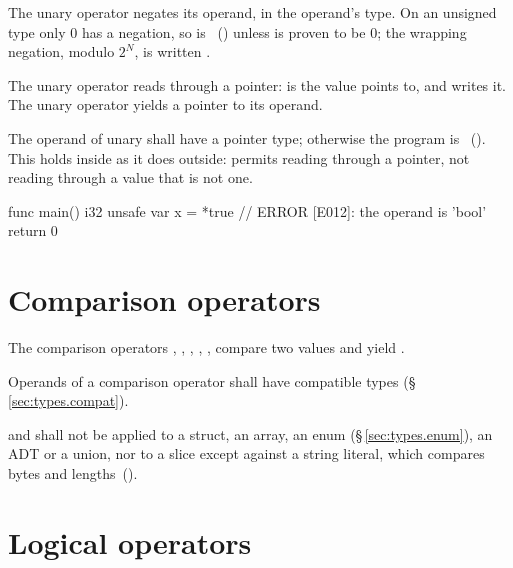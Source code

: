 \pnum
The unary \lain{-} operator negates its operand, in the operand's type.  On an unsigned
type only 0 has a negation, so  is \illformed{}~() unless 
is proven to be 0; the wrapping negation, modulo \(2^N\), is written .

\pnum
The unary \lain{*} operator reads through a pointer:  is the value  points to, and
 writes it.  The unary \lain{\&} operator yields a pointer to its operand.

\begin{constraint}
  The operand of unary \lain{*} shall have a pointer type; otherwise the program is
  \illformed{}~().  This holds inside  as it does outside: 
  permits reading through a pointer, not reading through a value that is not one.
\end{constraint}

\begin{laincode}
func main() i32 {
    unsafe {
        var x = *true      // ERROR [E012]: the operand is 'bool'
    }
    return 0
}
\end{laincode}

\section{Comparison operators}
\label{sec:expr.compare}

\pnum
The comparison operators \lain{==}, \lain{!=}, \lain{<}, \lain{>},
\lain{<=}, \lain{>=} compare two values and yield .

\begin{constraint}
  Operands of a comparison operator shall have compatible types
  (\S\,\ref{sec:types.compat}).
\end{constraint}

\begin{constraint}
  \lain{==} and \lain{!=} shall not be applied to a struct, an array, an enum
  (\S\,\ref{sec:types.enum}), an ADT or a union, nor to a slice except against a string literal,
  which compares bytes and lengths~().
\end{constraint}

\section{Logical operators}
\label{sec:expr.logical}

